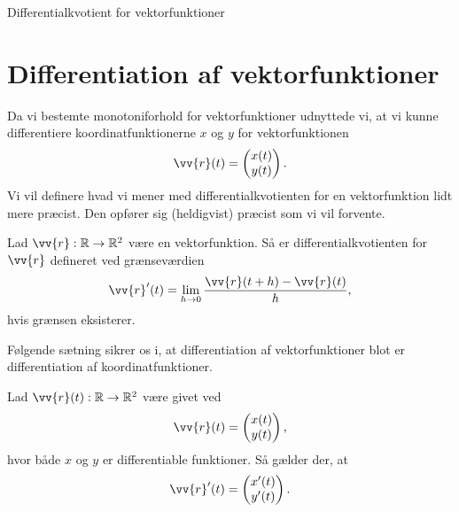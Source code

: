 \begin{center}
	\Huge
	Differentialkvotient for vektorfunktioner
\end{center}
\section*{Differentiation af vektorfunktioner}

Da vi bestemte monotoniforhold for vektorfunktioner udnyttede vi, at vi kunne differentiere koordinatfunktionerne $x$ og $y$ for vektorfunktionen
\begin{align*}
	\vv{r}(t) = 
	\begin{pmatrix}
		x(t) \\
		y(t)
	\end{pmatrix}.
\end{align*}
Vi vil definere hvad vi mener med differentialkvotienten for en vektorfunktion lidt mere præcist. Den opfører sig (heldigvist) præcist som vi vil forvente. 
\begin{defn}
	Lad $\vv{r}: \mathbb{R} \to \mathbb{R}^2$ være en vektorfunktion.
	Så er differentialkvotienten for $\vv{r}$ defineret ved grænseværdien
	\begin{align*}
		\vv{r}'(t) = \lim_{h\to 0}\frac{\vv{r}(t+h)-\vv{r}(t)}{h},
	\end{align*}
	hvis grænsen eksisterer. 	
\end{defn} 
Følgende sætning sikrer os i, at differentiation af vektorfunktioner blot er differentiation af koordinatfunktioner. 
\begin{setn}
	Lad $\vv{r}(t):\mathbb{R} \to \mathbb{R}^2$ være givet ved
	\begin{align*}
		\vv{r}(t) = 
		\begin{pmatrix}
			x(t) \\
			y(t)
		\end{pmatrix},
	\end{align*}
	hvor både $x$ og $y$ er differentiable funktioner. Så gælder der, at 
	\begin{align*}
		\vv{r}'(t) = 
		\begin{pmatrix}
			x'(t) \\
			y'(t)
		\end{pmatrix}.
	\end{align*}
\end{setn}

